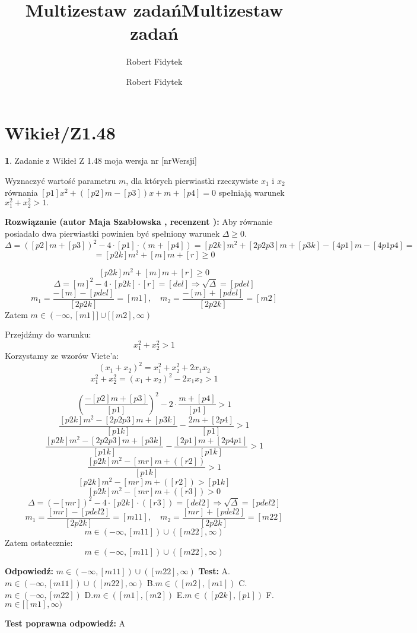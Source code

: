 \documentclass[12pt, a4paper]{article}
\title{Multizestaw zadań}
\author{Robert Fidytek}
\date{}\documentclass[12pt, a4paper]{article}
\title{Multizestaw zadań}
\author{Robert Fidytek}
\date{}
\theoremstyle{definition} %
\newtheorem{zad}{}
\theoremstyle{definition} %
\newtheorem{zad}{}
\newcommand{\kategoria}[1]{\section{#1}} %
\newcommand{\zadStart}[1]{\begin{zad}#1\newline} %
\newcommand{\zadStop}{\end{zad}}   %
\newcommand{\rozwStart}[2]{\noindent \textbf{Rozwiązanie (autor #1 , recenzent #2): }\newline} %
\newcommand{\rozwStop}{\newline}                                            %
\newcommand{\odpStart}{\noindent \textbf{Odpowiedź:}\newline}    %
\newcommand{\odpStop}{\newline}                                             %
\newcommand{\testStart}{\noindent \textbf{Test:}\newline} %
\newcommand{\testStop}{\newline} %
\newcommand{\kluczStart}{\noindent \textbf{Test poprawna odpowiedź:}\newline} %
\newcommand{\kluczStop}{\newline} %
\begin{document}
\maketitle


\kategoria{Wikieł/Z1.48}
\zadStart{Zadanie z Wikieł Z 1.48 moja wersja nr [nrWersji]}

Wyznaczyć wartość parametru $m$, dla których pierwiastki rzeczywiste $x_{1}$ i $x_{2}$ równania $[p1]x^{2}+([p2]m-[p3])x+m+[p4]=0$ spełniają warunek $x_{1}^{2}+x_{2}^{2}>1.$
\zadStop

\rozwStart{Maja Szabłowska}{}
Aby równanie posiadało dwa pierwiastki powinien być spełniony warunek $\Delta\geq0.$
$$\Delta=([p2]m+[p3])^{2}-4\cdot[p1]\cdot(m+[p4])=[p2k]m^{2}+[2p2p3]m+[p3k]-[4p1]m-[4p1p4]=$$
$$=[p2k]m^{2}+[m]m+[r]\geq0$$

$$[p2k]m^{2}+[m]m+[r]\geq0$$
$$\Delta=[m]^{2}-4\cdot[p2k]\cdot[r]=[del] \Rightarrow \sqrt{\Delta}=[pdel]$$
$$m_{1}=\frac{-[m]-[pdel]}{[2p2k]}=[m1], \quad m_{2}=\frac{-[m]+[pdel]}{[2p2k]}=[m2]$$
Zatem $m\in(-\infty,[m1]]\cup[[m2],\infty)$

Przejdźmy do warunku:
$$x_{1}^{2}+x_{2}^{2}>1$$
Korzystamy ze wzorów Viete'a:
$$(x_{1}+x_{2})^{2}=x_{1}^{2}+x_{2}^{2}+2x_{1}x_{2}$$
$$x_{1}^{2}+x_{2}^{2}=(x_{1}+x_{2})^{2}-2x_{1}x_{2}>1$$

$$\left(\frac{-[p2]m+[p3]}{[p1]}\right)^{2}-2\cdot \frac{m+[p4]}{[p1]}>1$$
$$\frac{[p2k]m^{2}-[2p2p3]m+[p3k]}{[p1k]}-\frac{2m+[2p4]}{[p1]}>1$$
$$\frac{[p2k]m^{2}-[2p2p3]m+[p3k]}{[p1k]}-\frac{[2p1]m+[2p4p1]}{[p1k]}>1$$
$$\frac{[p2k]m^{2}-[mr]m+([r2])}{[p1k]}>1$$
$$[p2k]m^{2}-[mr]m+([r2])>[p1k]$$
$$[p2k]m^{2}-[mr]m+([r3])>0$$
$$\Delta=(-[mr])^{2}-4\cdot[p2k]\cdot([r3])=[del2] \Rightarrow \sqrt{\Delta}=[pdel2]$$
$$m_{1}=\frac{[mr]-[pdel2]}{[2p2k]}=[m11], \quad m_{2}=\frac{[mr]+[pdel2]}{[2p2k]}=[m22]$$
$$m\in(-\infty, [m11])\cup([m22],\infty)$$
Zatem ostatecznie:
$$m\in(-\infty, [m11])\cup([m22],\infty)$$
\rozwStop


\odpStart
$m\in(-\infty, [m11])\cup([m22],\infty)$
\odpStop
\testStart
A.$m\in(-\infty, [m11])\cup([m22],\infty)$
B.$m\in([m2],[m1])$
C.$m\in(-\infty,[m22])$
D.$m\in([m1],[m2])$
E.$m\in([p2k],[p1])$
F.$m\in[[m1],\infty)$


\testStop
\kluczStart
A
\kluczStop
\end{document}
